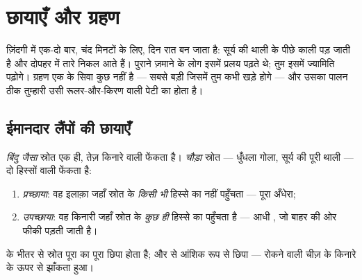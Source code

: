 \chapter{छायाएँ और ग्रहण}\label{ch:g7:shadows-eclipses}

ज़िंदगी में एक-दो बार, चंद मिनटों के लिए, दिन रात बन जाता है: सूर्य की
थाली  के पीछे काली पड़ जाती है और दोपहर में तारे निकल आते हैं।
पुराने ज़माने के लोग इसमें प्रलय पढ़ते थे; तुम इसमें ज्यामिति पढ़ोगे।
ग्रहण एक  के सिवा कुछ नहीं है --- सबसे बड़ी  जिसमें तुम कभी
खड़े होगे --- और उसका पालन ठीक तुम्हारी उसी रूलर-और-किरण वाली पेटी का
होता है।

\section{ईमानदार लैंपों की छायाएँ}

\begin{proposition}[प्रच्छाया और उपच्छाया]\label{prop:g7:shadows-eclipses:umbra}
\emph{बिंदु जैसा} स्रोत एक ही, तेज़ किनारे वाली  फेंकता है।
\emph{चौड़ा} स्रोत --- धुँधला गोला, सूर्य की पूरी थाली --- दो हिस्सों
वाली  फेंकता है:
\begin{enumerate}
  \item \emph{प्रच्छाया}: वह इलाक़ा जहाँ स्रोत के
        \emph{किसी भी} हिस्से का  नहीं पहुँचता --- पूरा अँधेरा;
  \item \emph{उपच्छाया}: वह किनारी जहाँ स्रोत के
        \emph{कुछ ही} हिस्से का  पहुँचता है --- आधी , जो
        बाहर की ओर फीकी पड़ती जाती है।
\end{enumerate}
 के भीतर से स्रोत पूरा का पूरा छिपा होता है; और  से
आंशिक रूप से छिपा --- रोकने वाली चीज़ के किनारे के ऊपर से झाँकता हुआ।
\end{proposition}

